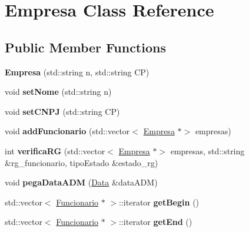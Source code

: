 \hypertarget{classEmpresa}{}\section{Empresa Class Reference}
\label{classEmpresa}
\subsection*{Public Member Functions}
\begin{DoxyCompactItemize}
\item 
\mbox{\label{classEmpresa_ab783265086554404af6f736ff9d0d7a8}} 
{\bfseries Empresa} (std\+::string n, std\+::string CP)
\item 
\mbox{\label{classEmpresa_ae09e36a3ebf47d1b0d7e22daaf48d4f2}} 
void {\bfseries set\+Nome} (std\+::string n)
\item 
\mbox{\label{classEmpresa_a156749c88810780ca1a62f05b06bb58d}} 
void {\bfseries set\+C\+N\+PJ} (std\+::string CP)
\item 
\mbox{\label{classEmpresa_ac725f5fcfc4b0b657ee46e3df6380b32}} 
void {\bfseries add\+Funcionario} (std\+::vector$<$ \hyperlink{classEmpresa}{Empresa} $\ast$$>$ empresas)
\item 
\mbox{\label{classEmpresa_ac7f4538cb5558feb51a6ec0a4862c4f4}} 
int {\bfseries verifica\+RG} (std\+::vector$<$ \hyperlink{classEmpresa}{Empresa} $\ast$$>$ empresas, std\+::string \&rg\+\_\+funcionario, tipo\+Estado \&estado\+\_\+rg)
\item 
\mbox{\label{classEmpresa_a1e95bbb3040949ff8c2c9d9c72790f77}} 
void {\bfseries pega\+Data\+A\+DM} (\hyperlink{classData}{Data} \&data\+A\+DM)
\item 
\mbox{\label{classEmpresa_a8c0e59dc8f5572cec43dc0c6024b9188}} 
std\+::vector$<$ \hyperlink{classFuncionario}{Funcionario} $\ast$ $>$\+::iterator {\bfseries get\+Begin} ()
\item 
\mbox{\label{classEmpresa_af748aca402403db39d1fc026206d3a5c}} 
std\+::vector$<$ \hyperlink{classFuncionario}{Funcionario} $\ast$ $>$\+::iterator {\bfseries get\+End} ()

\end{DoxyCompactItemize}
